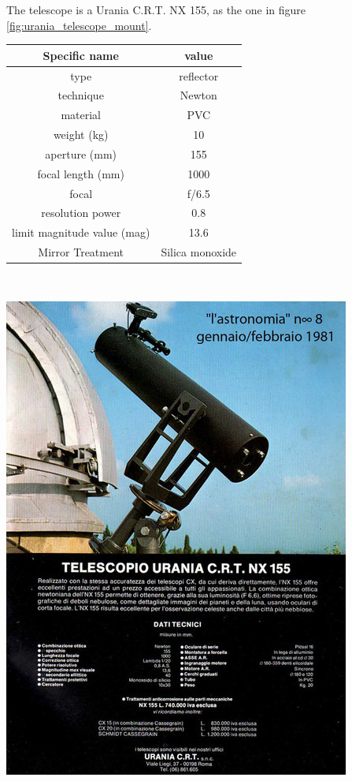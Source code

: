 \documentclass{article}
\begin{document}
\begin{multicols}{2}
        The telescope is a Urania C.R.T. NX 155, as the one in figure \ref{fig:urania_telescope_mount}.
        \\
        \begin{minipage}{0.5\textwidth}
            \centering
            \begin{tabular}{c|c}
                Specific name & value \\
                \hline
                type & reflector \\
                technique & Newton  \\
                material & PVC  \\
                weight (kg) & 10 \\
                aperture (mm) & 155 \\
                focal length (mm) & 1000 \\
                focal & f/6.5 \\
                resolution power & 0.8 \\
                limit magnitude value (mag) & 13.6 \\
                Mirror Treatment & Silica monoxide \\
                \hline
            \end{tabular}
        \end{minipage}
        \\
        \begin{minipage}{0.5\textwidth}
            \centering
            \includegraphics[scale=0.4]{images/urania_upper.jpg}
            \label{fig:urania_telescope_mount}
        \end{minipage}


\end{multicols}
\end{document}
